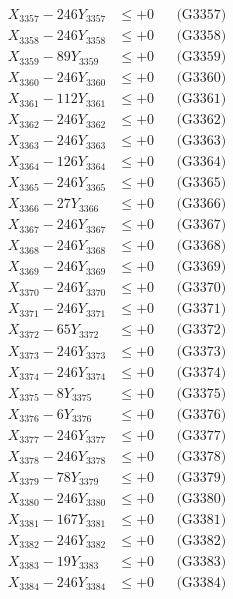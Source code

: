 \documentclass[a4paper,10pt]{article}
\begin{document}
{\begin{align}
X_{3357} - 246Y_{3357} &\leq +0 && \text{(G3357)} \\
X_{3358} - 246Y_{3358} &\leq +0 && \text{(G3358)} \\
X_{3359} - 89Y_{3359} &\leq +0 && \text{(G3359)} \\
X_{3360} - 246Y_{3360} &\leq +0 && \text{(G3360)} \\
\allowbreak
X_{3361} - 112Y_{3361} &\leq +0 && \text{(G3361)} \\
X_{3362} - 246Y_{3362} &\leq +0 && \text{(G3362)} \\
X_{3363} - 246Y_{3363} &\leq +0 && \text{(G3363)} \\
X_{3364} - 126Y_{3364} &\leq +0 && \text{(G3364)} \\
X_{3365} - 246Y_{3365} &\leq +0 && \text{(G3365)} \\
X_{3366} - 27Y_{3366} &\leq +0 && \text{(G3366)} \\
X_{3367} - 246Y_{3367} &\leq +0 && \text{(G3367)} \\
X_{3368} - 246Y_{3368} &\leq +0 && \text{(G3368)} \\
X_{3369} - 246Y_{3369} &\leq +0 && \text{(G3369)} \\
X_{3370} - 246Y_{3370} &\leq +0 && \text{(G3370)} \\
\allowbreak
X_{3371} - 246Y_{3371} &\leq +0 && \text{(G3371)} \\
X_{3372} - 65Y_{3372} &\leq +0 && \text{(G3372)} \\
X_{3373} - 246Y_{3373} &\leq +0 && \text{(G3373)} \\
X_{3374} - 246Y_{3374} &\leq +0 && \text{(G3374)} \\
X_{3375} - 8Y_{3375} &\leq +0 && \text{(G3375)} \\
X_{3376} - 6Y_{3376} &\leq +0 && \text{(G3376)} \\
X_{3377} - 246Y_{3377} &\leq +0 && \text{(G3377)} \\
X_{3378} - 246Y_{3378} &\leq +0 && \text{(G3378)} \\
X_{3379} - 78Y_{3379} &\leq +0 && \text{(G3379)} \\
X_{3380} - 246Y_{3380} &\leq +0 && \text{(G3380)} \\
\allowbreak
X_{3381} - 167Y_{3381} &\leq +0 && \text{(G3381)} \\
X_{3382} - 246Y_{3382} &\leq +0 && \text{(G3382)} \\
X_{3383} - 19Y_{3383} &\leq +0 && \text{(G3383)} \\
X_{3384} - 246Y_{3384} &\leq +0 && \text{(G3384)} \\

\end{align}}
\end{document}
